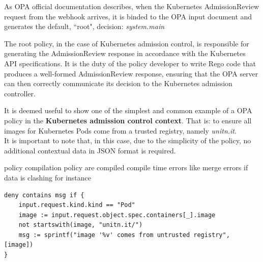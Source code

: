 




As OPA official documentation describes, when the Kubernetes AdmissionReview request from the webhook arrives, it is binded to the OPA input document and generates the default, ``root", decision: \textit{system.main}

The root policy, in the case of Kubernetes admission control, is responsible for generating the AdmissionReview response in accordance with the Kubernetes API specifications. It is the duty of the policy developer to write Rego code that produces a well-formed AdmissionReview response, ensuring that the OPA server can then correctly communicate its decision to the Kubernetes admission controller.

It is deemed useful to show one of the simplest and common example of a OPA policy in the \textbf{Kubernetes admission control context}. That is: to ensure all images for Kubernetes Pods come from a trusted registry, namely \textit{unitn.it}. \\


It is important to note that, in this case, due to the simplicity of the policy, no additional contextual data in JSON format is required.


policy compilation
policy are compiled
compile time errors like merge errors if data is clashing for instance

\begin{lstlisting}[language=Rego, caption={Rego policy for Pods registry},
label=lst:rego_data_mapping]                              
deny contains msg if {                                                      
    input.request.kind.kind == "Pod"                                        
    image := input.request.object.spec.containers[_].image                  
    not startswith(image, "unitn.it/")                                     
    msg := sprintf("image '%v' comes from untrusted registry", [image])     
}
\end{lstlisting}

